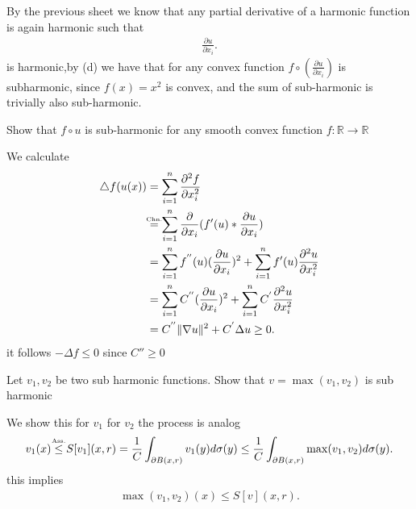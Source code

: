 \begin{solution}
  By the previous sheet we know that any partial derivative of a harmonic function is again harmonic such that 
  \begin{align*}
    \frac{\partial u}{\partial x_i}
  .\end{align*}
  is harmonic,by (d) we have that for any convex function $f \circ (\frac{\partial u}{\partial x_i})$   is subharmonic,
  since $f(x) = x^2$ is convex, and the sum of sub-harmonic is trivially also sub-harmonic.
\end{solution}
\begin{question}[d]
 Show that $f \circ u$  is sub-harmonic for any smooth convex function $f : \mathbb{R} \to \mathbb{R} $
\end{question}
\begin{solution}
 We calculate 
 \begin{align*}
   \triangle f(u(x)) &= \sum_{i=1}^{n} \frac{\partial ^2 f}{\partial x_i^2}  \\
                     &\myS{Chn.}{=} \sum_{i=1}^{n} \frac{\partial}{\partial x_i}(f'(u)*\frac{\partial u}{\partial x_i})\\
                     &= \sum_{i=1}^{n} f^{''}(u) (\frac{\partial u}{\partial x_i})^2 + \sum_{i=1}^{n} f'(u)  \frac{\partial ^2 u}{\partial x_i^2}\\
                     &= \sum_{i=1}^{n} C^{''}  (\frac{\partial u}{\partial x_i})^2 + \sum_{i=1}^{n} C^{'}  \frac{\partial ^2 u}{\partial x_i^2}  \\
                     &= C^{''} \|\nabla u\|^2 + C^{'} \Delta u \ge 0  
 .\end{align*}
it follows $- \Delta f \le 0$  since $C'' \ge 0$
\end{solution}
\begin{question}[e]
 Let $v_{1},v_{2}$  be two sub harmonic functions. Show that $v = \max(v_{1},v_{2})$ is sub harmonic 
\end{question}
\begin{solution}
 We show this for $v_{1}$  for $v_{2}$  the process is analog 
 \begin{align*}
   v_{1}(x) \myS{Ass.}{\le } S[v_{1}](x,r) = \frac{1}{C} \int_{\partial B(x,r)} v_{1}(y) d\sigma(y) \le  \frac{1}{C} \int_{\partial B(x,r)}\max(v_{1},v_{2}) d\sigma(y) 
 .\end{align*}
 this implies 
 \begin{align*}
   \max(v_{1},v_{2})(x) \le  S[v](x,r)
 .\end{align*}
\end{solution}
